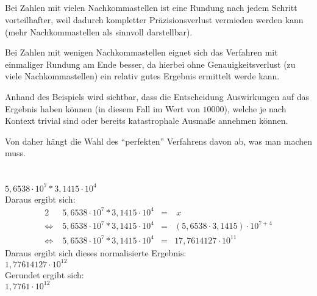 \documentclass[10pt,a4paper,oneside,ngerman,numbers=noenddot]{scrartcl}
\begin{document}
\subsection{}
Bei Zahlen mit vielen Nachkommastellen ist eine Rundung nach jedem Schritt vorteilhafter, weil dadurch kompletter Präzisionsverlust vermieden werden kann (mehr Nachkommastellen als sinnvoll darstellbar).

Bei Zahlen mit wenigen Nachkommastellen eignet sich das Verfahren mit einmaliger Rundung am Ende besser, da hierbei ohne Genauigkeitsverlust (zu viele Nachkommastellen) ein relativ gutes Ergebnis ermittelt werde kann.

Anhand des Beispiels wird sichtbar, dass die Entscheidung Auswirkungen auf das Ergebnis haben können (in diesem Fall im Wert von $10000$), welche je nach Kontext trivial sind oder bereits katastrophale Ausmaße annehmen können.

Von daher hängt die Wahl des "`perfekten"' Verfahrens davon ab, was man machen muss. 
\section{}%
$5,6538 \cdot 10^{7} * 3,1415 \cdot 10^{4}$\\
Daraus ergibt sich:\\
\begin{alignat}{2}
&\; 5,6538 \cdot 10^{7} * 3,1415 \cdot 10^{4} &=&\: x\\
\Leftrightarrow &\; 5,6538 \cdot 10^{7} * 3,1415 \cdot 10^{4} &=& (5,6538 \cdot 3,1415) \cdot 10^{7+4}\\
\Leftrightarrow &\; 5,6538 \cdot 10^{7} * 3,1415 \cdot 10^{4} &=& 17,7614127 \cdot 10^{11}
\end{alignat}
Daraus ergibt sich dieses normalisierte Ergebnis:\\
$1,77614127 \cdot 10^{12}$\\
Gerundet ergibt sich:\\
$1,7761 \cdot 10^{12}$
\end{document}
